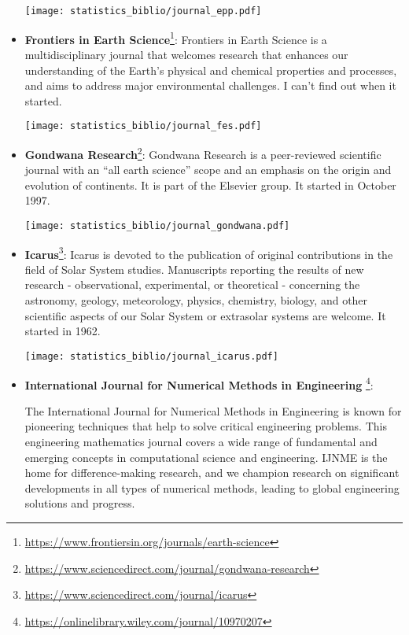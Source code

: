 \begin{itemize}
\begin{center}
\texttt{[image: statistics\_biblio/journal\_epp.pdf]}
\end{center}

\item {\bf Frontiers in Earth Science}\footnote{\url{https://www.frontiersin.org/journals/earth-science}}:
Frontiers in Earth Science is a multidisciplinary journal that welcomes research that enhances 
our understanding of the Earth’s physical and chemical properties and processes, and aims to 
address major environmental challenges.
I can't find out when it started.

\begin{center}
\texttt{[image: statistics\_biblio/journal\_fes.pdf]}
\end{center}

\item {\bf Gondwana Research}\footnote{\url{https://www.sciencedirect.com/journal/gondwana-research}}:
Gondwana Research is a peer-reviewed scientific journal with an ``all earth science'' scope 
and an emphasis on the origin and evolution of continents. It is part of the Elsevier group.
It started in October 1997.
\begin{center}
\texttt{[image: statistics\_biblio/journal\_gondwana.pdf]}
\end{center}

\item {\bf Icarus}\footnote{\url{https://www.sciencedirect.com/journal/icarus}}:
Icarus is devoted to the publication of original contributions in the field of Solar System studies. Manuscripts reporting the results of new research - observational, experimental, or theoretical - concerning the astronomy, geology, meteorology, physics, chemistry, biology, and other scientific aspects of our Solar System or extrasolar systems are welcome.
It started in 1962. 

\begin{center}
\texttt{[image: statistics\_biblio/journal\_icarus.pdf]}
\end{center}

\item {\bf International Journal for Numerical Methods in Engineering}
\footnote{\url{https://onlinelibrary.wiley.com/journal/10970207}}:

The International Journal for Numerical Methods in Engineering is known for pioneering techniques that help to solve critical engineering problems. This engineering mathematics journal covers a wide range of fundamental and emerging concepts in computational science and engineering. IJNME is the home for difference-making research, and we champion research on significant developments in all types of numerical methods, leading to global engineering solutions and progress. 


\end{itemize}
